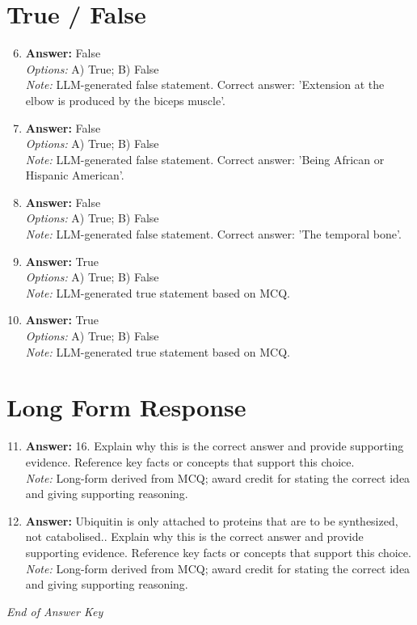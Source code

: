 \documentclass[12pt]{article}
\begin{document}
\section*{True / False}
\begin{enumerate}[label=\arabic*.]
\setcounter{enumi}{5}
\item \textbf{Answer:} False
\\ \textit{Options:} A) True; B) False
\\ \textit{Note:} LLM-generated false statement. Correct answer: 'Extension at the elbow is produced by the biceps muscle'.
\item \textbf{Answer:} False
\\ \textit{Options:} A) True; B) False
\\ \textit{Note:} LLM-generated false statement. Correct answer: 'Being African or Hispanic American'.
\item \textbf{Answer:} False
\\ \textit{Options:} A) True; B) False
\\ \textit{Note:} LLM-generated false statement. Correct answer: 'The temporal bone'.
\item \textbf{Answer:} True
\\ \textit{Options:} A) True; B) False
\\ \textit{Note:} LLM-generated true statement based on MCQ.
\item \textbf{Answer:} True
\\ \textit{Options:} A) True; B) False
\\ \textit{Note:} LLM-generated true statement based on MCQ.
\end{enumerate}

\section*{Long Form Response}
\begin{enumerate}[label=\arabic*.]
\setcounter{enumi}{10}
\item \textbf{Answer:} 16. Explain why this is the correct answer and provide supporting evidence. Reference key facts or concepts that support this choice.
\\ \textit{Note:} Long-form derived from MCQ; award credit for stating the correct idea and giving supporting reasoning.
\item \textbf{Answer:} Ubiquitin is only attached to proteins that are to be synthesized, not catabolised.. Explain why this is the correct answer and provide supporting evidence. Reference key facts or concepts that support this choice.
\\ \textit{Note:} Long-form derived from MCQ; award credit for stating the correct idea and giving supporting reasoning.
\end{enumerate}

\vfill
\noindent\textit{End of Answer Key}
\end{document}
